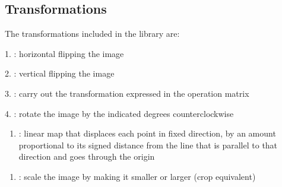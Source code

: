 \documentclass[letterpaper,10pt,english]{sphinxmanual}
\begin{document}
\subsection{Transformations}
\label{\detokenize{overview:transformations}}
The transformations included in the library are:

1. :
horizontal flipping the image


2. :
vertical flipping the image


3. :
carry out the transformation expressed in the operation matrix


4. :
rotate the image by the indicated degrees counterclockwise

\begin{enumerate}
%
\setcounter{enumi}{4}
\item {} 
: linear map that displaces each point in fixed direction, by an amount proportional to its signed distance from the line that is parallel to that direction and goes through the origin

\end{enumerate}

\begin{enumerate}
%
\setcounter{enumi}{5}
\item {} 
: scale the image by making it smaller or larger (crop equivalent)

\end{enumerate}
\end{document}
